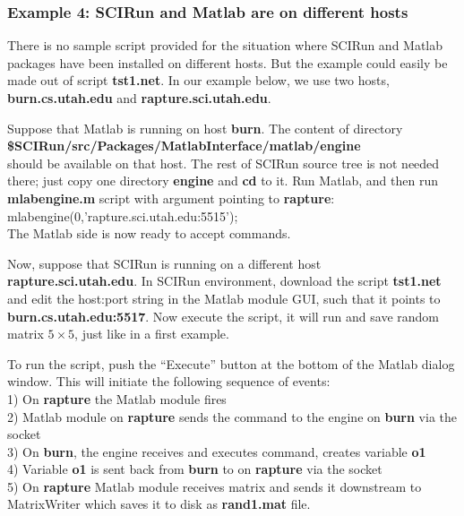 \subsubsection{Example 4: SCIRun and Matlab are on different hosts} \indent

There is no sample script provided for the situation where SCIRun and
Matlab packages have been installed on different hosts. But the example
could easily be made out of script {\bf tst1.net}.  In our example
below, we use two hosts, {\bf burn.cs.utah.edu} and
{\bf rapture.sci.utah.edu}.

Suppose that Matlab is running on host {\bf burn}. The
content of directory \\
{\bf \$SCIRun/src/Packages/MatlabInterface/matlab/engine} \\
should be available on that host. The rest of SCIRun source tree is
not needed there; just copy one directory {\bf engine} and {\bf cd} to it. 
Run Matlab, and then run {\bf mlabengine.m} script with argument
pointing to {\bf rapture}: \\
mlabengine(0,'rapture.sci.utah.edu:5515'); \\
The Matlab side is now ready to accept commands.

Now, suppose that SCIRun is running on a different host \\
{\bf rapture.sci.utah.edu}. 
In SCIRun environment, download the script {\bf tst1.net} 
and edit the host:port
string in the Matlab module GUI, such that it points to 
{\bf burn.cs.utah.edu:5517}. Now execute the script, it will
run and save random matrix $5\times 5$, just like in a first
example.

To run the script, push the ``Execute'' button at the bottom of the
Matlab dialog window. This will initiate the following
sequence of events: \\
1) On {\bf rapture} the Matlab module fires \\
2) Matlab module on {\bf rapture} sends the command to the engine on
{\bf burn} via the socket\\
3) On {\bf burn}, the engine receives and executes command, creates variable {\bf o1} \\
4) Variable {\bf o1} is sent back from {\bf burn} to \sr{} on {\bf rapture} via the socket \\
5) On {\bf rapture} \sr{} Matlab module receives matrix and sends it downstream
   to MatrixWriter which saves it to disk as {\bf rand1.mat} file. \\

